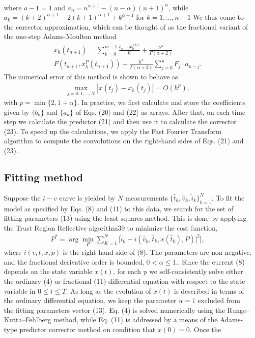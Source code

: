 \documentclass[10pt]{article}
\begin{document}
\begin{multicols}{2}
\begin{align}
\end{align}
where $a-1 = 1$ and $a_n = n^{\alpha + 1}-(n-\alpha)(n+1)^\alpha$, while $a_k = (k+2)^{\alpha + 1} - 2(k+1)^{\alpha + 1} + k^{\alpha + 1}$ for $k = 1, ..., n-1$ We thus come to the corrector approximation, which can be thought of as the fractional variant of the one-step Adams-Moulton method
\begin{align}
   x_h(t_{n+1})=\sum_{k=0}^{m-1} \frac{t_{n+1}x_0^{(k)}}{k!} + \frac{h^\alpha}{\Gamma (\alpha + 2)} \\ F(t_{n+1}, x_h^P (t_{n+1})) + \frac{h^\alpha}{\Gamma (\alpha + 2)} \sum_{j=0}^n F_j \cdot a_{n-j}.
\end{align}
The numerical error of this method is shown to behave as
\begin{align}
   \max_{j=0,1,...,N} |x(t_j)-x_h(t_j)|=O(h^p),
\end{align}
with $p=\min\{2,1+\alpha\}$. In practice, we first calculate and store the coefficients given by $\{b_k\}$ and $\{a_k\}$ of Eqs. (20) and (22) as arrays. After that, on each time step we calculate the predictor (21) and then use it to calculate the corrector (23). To speed up the calculations, we apply the Fast Fourier Transform algorithm to compute the convolutions on the right-hand sides of Eqs. (21) and (23).
{\centering \subsection{Fitting method}}
Suppose the $i-v$ curve is yielded by $N$ measurements $\{\hat{t}_k, \hat{v}_k, \hat{i}_k\}_{k=1}^N$. To fit the model as specified by Eqs. (8) and (11) to this data, we search for the set of fitting
parameters (13) using the least squares method. This is done by applying the Trust Region Reflective algorithm39 to minimize the cost function,
\begin{align}
   P^* = \arg \min_P \sum_{K=1}^N \biggl[\hat{i}_k-i(\hat{v}_k,\hat{t}_k, x(\hat{t}_k),P)]^2 \biggr],
\end{align}
where $i(v, t, x, p)$ is the right-hand side of (8). The parameters are non-negative, and the fractional derivative order is bounded, $0 < \alpha \le 1.$. Since the current (8) depends on the state variable $x(t)$, for each p we self-consistently solve either the ordinary (4) or fractional (11) differential equation with respect to the state variable in $0 \le t \le T$. As long as the evolution of $x(t)$ is described in terms of the ordinary differential equation, we keep the parameter $\alpha = 1$ excluded from the fitting parameters vector (13). Eq. (4) is solved numerically using the Runge–Kutta–Fehlberg method, while Eq. (11) is addressed by a means of the Adams-type predictor corrector method on condition that $x(0) = 0$. Once the \\

\end{multicols}
\end{document}
